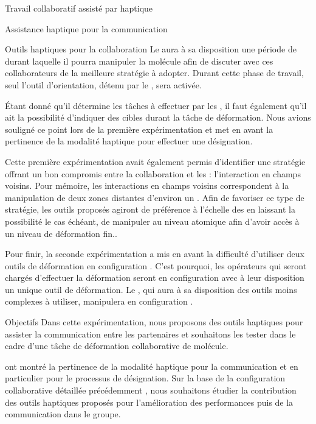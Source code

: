 \documentclass[myfrancais,ngerman,english,french]{mythesis}
\begin{document}
\begin{mychapter}{Travail collaboratif assisté par haptique}
\begin{mysection}{Assistance haptique pour la communication}
\begin{mysubsection}{Outils haptiques pour la collaboration}
				Le  aura à sa disposition une période de \mybrainstorming durant laquelle il pourra manipuler la molécule afin de discuter avec ces collaborateurs de la meilleure stratégie à adopter.
				Durant cette phase de travail, seul l'outil d'orientation, détenu par le , sera activée.

				Étant donné qu'il détermine les tâches à effectuer par les , il faut également qu'il ait la possibilité d'indiquer des cibles durant la tâche de déformation.
				Nous avions souligné ce point lors de la première expérimentation et  met en avant la pertinence de la modalité haptique pour effectuer une désignation.

				Cette première expérimentation avait également permis d'identifier une stratégie offrant un bon compromis entre la collaboration et les  : l'interaction en champs voisins.
				Pour mémoire, les interactions en champs voisins correspondent à la manipulation de deux zones distantes d'environ un .
				Afin de favoriser ce type de stratégie, les outils proposés agiront de préférence à l'échelle des  en laissant la possibilité le cas échéant, de manipuler au niveau atomique afin d'avoir accès à un niveau de déformation fin..

				Pour finir, la seconde expérimentation a mis en avant la difficulté d'utiliser deux outils de déformation en configuration .
				C'est pourquoi, les opérateurs qui seront chargés d'effectuer la déformation seront en configuration  avec à leur disposition un unique outil de déformation.
				Le , qui aura à sa disposition des outils moins complexes à utiliser, manipulera en configuration .
			\end{mysubsection}
			\begin{mysubsection}{Objectifs}
				Dans cette expérimentation, nous proposons des outils haptiques pour assister la communication entre les partenaires et souhaitons les tester dans le cadre d'une tâche de déformation collaborative de molécule.

				 ont montré la pertinence de la modalité haptique pour la communication et en particulier pour le processus de désignation.
				Sur la base de la configuration collaborative détaillée précédemment , nous souhaitons étudier la contribution des outils haptiques proposés pour l'amélioration des performances puis de la communication dans le groupe.


\end{mysubsection}
\end{mysection}
\end{mychapter}
\end{document}
